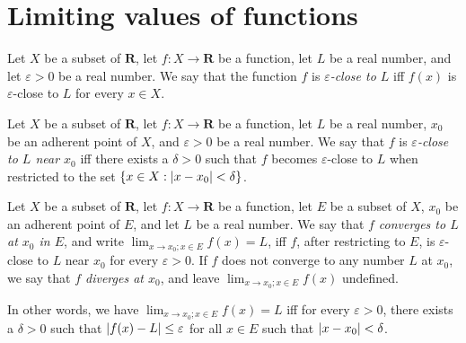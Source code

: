 \section{Limiting values of functions}\label{sec 9.3}

\begin{definition}\label{9.3.1}
    Let \(X\) be a subset of \(\mathbf{R}\), let \(f : X \to \mathbf{R}\) be a function, let \(L\) be a real number, and let \(\varepsilon > 0\) be a real number.
    We say that the function \(f\) is \emph{\(\varepsilon\)-close to \(L\)} iff \(f(x)\) is \(\varepsilon\)-close to \(L\) for every \(x \in X\).
\end{definition}

\setcounter{theorem}{2}
\begin{definition}\label{9.3.3}
    Let \(X\) be a subset of \(\mathbf{R}\), let \(f : X \to \mathbf{R}\) be a function, let \(L\) be a real number, \(x_0\) be an adherent point of \(X\), and \(\varepsilon > 0\) be a real number.
    We say that \(f\) is \emph{\(\varepsilon\)-close to \(L\) near \(x_0\)} iff there exists a \(\delta > 0\) such that \(f\) becomes \(\varepsilon\)-close to \(L\) when restricted to the set \(\{x \in X : \abs*{x - x_0} < \delta\}\).
\end{definition}

\setcounter{theorem}{5}
\begin{definition}\label{9.3.6}
    Let \(X\) be a subset of \(\mathbf{R}\), let \(f : X \to \mathbf{R}\) be a function, let \(E\) be a subset of \(X\), \(x_0\) be an adherent point of \(E\), and let \(L\) be a real number.
    We say that \emph{\(f\) converges to \(L\) at \(x_0\) in \(E\)}, and write \(\lim_{x \to x_0 ; x \in E} f(x) = L\), iff \(f\), after restricting to \(E\), is \(\varepsilon\)-close to \(L\) near \(x_0\) for every \(\varepsilon > 0\).
    If \(f\) does not converge to any number \(L\) at \(x_0\), we say that \emph{\(f\) diverges at \(x_0\)}, and leave \(\lim_{x \to x_0 ; x \in E} f(x)\) undefined.
\end{definition}

\begin{note}
    In other words, we have \(\lim_{x \to x_0 ; x \in E} f(x) = L\) iff for every \(\varepsilon > 0\), there exists a \(\delta > 0\) such that \(\abs*{f(x) - L} \leq \varepsilon\) for all \(x \in E\) such that \(\abs*{x - x_0} < \delta\).
\end{note}

